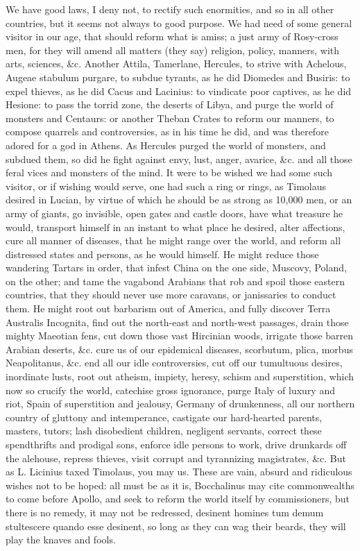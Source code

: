 {We have good laws, I deny not, to rectify such enormities, and so in
all other countries, but it seems not always to good purpose. We had
need of some general visitor in our age, that should reform what is
amiss; a just army of Rosy-cross men, for they will amend all matters
(they say) religion, policy, manners, with arts, sciences, \&c. Another
Attila, Tamerlane, Hercules, to strive with Achelous, Augeae stabulum
purgare, to subdue tyrants, as he did Diomedes and Busiris: to
expel thieves, as he did Cacus and Lacinius: to vindicate poor
captives, as he did Hesione: to pass the torrid zone, the deserts of
Libya, and purge the world of monsters and Centaurs: or another Theban
Crates to reform our manners, to compose quarrels and controversies, as
in his time he did, and was therefore adored for a god in Athens. As
Hercules purged the world of monsters, and subdued them, so did he
fight against envy, lust, anger, avarice, \&c. and all those feral vices
and monsters of the mind. It were to be wished we had some such
visitor, or if wishing would serve, one had such a ring or rings, as
Timolaus desired in Lucian, by virtue of which he should be as
strong as 10,000 men, or an army of giants, go invisible, open gates
and castle doors, have what treasure he would, transport himself in an
instant to what place he desired, alter affections, cure all manner of
diseases, that he might range over the world, and reform all distressed
states and persons, as he would himself. He might reduce those
wandering Tartars in order, that infest China on the one side, Muscovy,
Poland, on the other; and tame the vagabond Arabians that rob and spoil
those eastern countries, that they should never use more caravans, or
janissaries to conduct them. He might root out barbarism out of
America, and fully discover Terra Australis Incognita, find out the
north-east and north-west passages, drain those mighty Maeotian fens,
cut down those vast Hircinian woods, irrigate those barren Arabian
deserts, \&c. cure us of our epidemical diseases, scorbutum, plica,
morbus Neapolitanus, \&c. end all our idle controversies, cut off our
tumultuous desires, inordinate lusts, root out atheism, impiety,
heresy, schism and superstition, which now so crucify the world,
catechise gross ignorance, purge Italy of luxury and riot, Spain of
superstition and jealousy, Germany of drunkenness, all our northern
country of gluttony and intemperance, castigate our hard-hearted
parents, masters, tutors; lash disobedient children, negligent
servants, correct these spendthrifts and prodigal sons, enforce idle
persons to work, drive drunkards off the alehouse, repress thieves,
visit corrupt and tyrannizing magistrates, \&c. But as L. Licinius taxed
Timolaus, you may us. These are vain, absurd and ridiculous wishes not
to be hoped: all must be as it is, Bocchalinus may cite
commonwealths to come before Apollo, and seek to reform the world
itself by commissioners, but there is no remedy, it may not be
redressed, desinent homines tum demum stultescere quando esse desinent,
so long as they can wag their beards, they will play the knaves and
fools.

}
